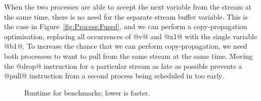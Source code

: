
When the two processes are able to accept the next variable from the stream at the same time, there is no need for the separate stream buffer variable. This is the case in Figure~\ref{fig:Process:Fused}, and we can perform a copy-propagation optimisation, replacing all occurrences of @v@ and @x1@ with the single variable @b1@. To increase the chance that we can perform copy-propagation, we need both processess to want to pull from the same stream at the same time. Moving the @drop@ instruction for a particular stream as late as possible prevents a @pull@ instruction from a second process being scheduled in too early.




\begin{figure}
\caption{Runtime for benchmarks; lower is faster.}
\label{fig:bench:all}
\end{figure}


